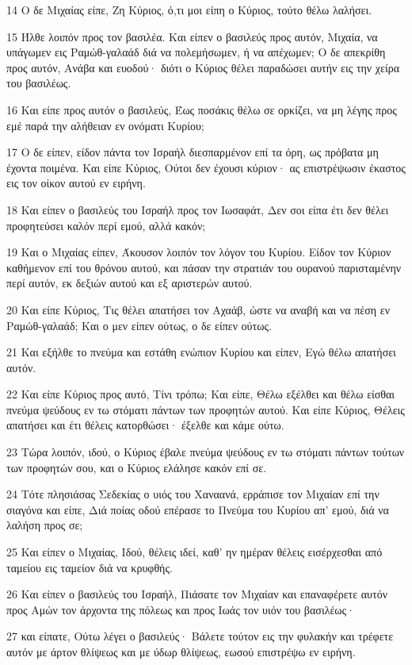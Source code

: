 \par 14 Ο δε Μιχαίας είπε, Ζη Κύριος, ό,τι μοι είπη ο Κύριος, τούτο θέλω λαλήσει.
\par 15 Ήλθε λοιπόν προς τον βασιλέα. Και είπεν ο βασιλεύς προς αυτόν, Μιχαία, να υπάγωμεν εις Ραμώθ-γαλαάδ διά να πολεμήσωμεν, ή να απέχωμεν; Ο δε απεκρίθη προς αυτόν, Ανάβα και ευοδού· διότι ο Κύριος θέλει παραδώσει αυτήν εις την χείρα του βασιλέως.
\par 16 Και είπε προς αυτόν ο βασιλεύς, Έως ποσάκις θέλω σε ορκίζει, να μη λέγης προς εμέ παρά την αλήθειαν εν ονόματι Κυρίου;
\par 17 Ο δε είπεν, είδον πάντα τον Ισραήλ διεσπαρμένον επί τα όρη, ως πρόβατα μη έχοντα ποιμένα. Και είπε Κύριος, Ούτοι δεν έχουσι κύριον· ας επιστρέψωσιν έκαστος εις τον οίκον αυτού εν ειρήνη.
\par 18 Και είπεν ο βασιλεύς του Ισραήλ προς τον Ιωσαφάτ, Δεν σοι είπα έτι δεν θέλει προφητεύσει καλόν περί εμού, αλλά κακόν;
\par 19 Και ο Μιχαίας είπεν, Άκουσον λοιπόν τον λόγον του Κυρίου. Είδον τον Κύριον καθήμενον επί του θρόνου αυτού, και πάσαν την στρατιάν του ουρανού παρισταμένην περί αυτόν, εκ δεξιών αυτού και εξ αριστερών αυτού.
\par 20 Και είπε Κύριος, Τις θέλει απατήσει τον Αχαάβ, ώστε να αναβή και να πέση εν Ραμώθ-γαλαάδ; Και ο μεν είπεν ούτως, ο δε είπεν ούτως.
\par 21 Και εξήλθε το πνεύμα και εστάθη ενώπιον Κυρίου και είπεν, Εγώ θέλω απατήσει αυτόν.
\par 22 Και είπε Κύριος προς αυτό, Τίνι τρόπω; Και είπε, Θέλω εξέλθει και θέλω είσθαι πνεύμα ψεύδους εν τω στόματι πάντων των προφητών αυτού. Και είπε Κύριος, Θέλεις απατήσει και έτι θέλεις κατορθώσει· έξελθε και κάμε ούτω.
\par 23 Τώρα λοιπόν, ιδού, ο Κύριος έβαλε πνεύμα ψεύδους εν τω στόματι πάντων τούτων των προφητών σου, και ο Κύριος ελάλησε κακόν επί σε.
\par 24 Τότε πλησιάσας Σεδεκίας ο υιός του Χαναανά, ερράπισε τον Μιχαίαν επί την σιαγόνα και είπε, Διά ποίας οδού επέρασε το Πνεύμα του Κυρίου απ' εμού, διά να λαλήση προς σε;
\par 25 Και είπεν ο Μιχαίας, Ιδού, θέλεις ιδεί, καθ' ην ημέραν θέλεις εισέρχεσθαι από ταμείου εις ταμείον διά να κρυφθής.
\par 26 Και είπεν ο βασιλεύς του Ισραήλ, Πιάσατε τον Μιχαίαν και επαναφέρετε αυτόν προς Αμών τον άρχοντα της πόλεως και προς Ιωάς τον υιόν του βασιλέως·
\par 27 και είπατε, Ούτω λέγει ο βασιλεύς· Βάλετε τούτον εις την φυλακήν και τρέφετε αυτόν με άρτον θλίψεως και με ύδωρ θλίψεως, εωσού επιστρέψω εν ειρήνη.
